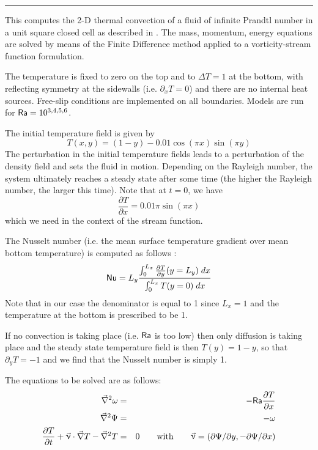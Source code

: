 \par\noindent\rule{\textwidth}{0.4pt}



This \stone computes the 2-D thermal convection of a fluid 
of infinite Prandtl number in a unit square closed cell as described in \textcite{blbc89}.
The mass, momentum, energy equations are solved by means of the Finite Difference method
applied to a vorticity-stream function formulation.

The temperature is fixed to zero on the top and to $\Delta T=1$ at the bottom, 
with reflecting symmetry at the sidewalls (i.e. $\partial_x T=0$) 
and there are no internal heat sources. 
Free-slip conditions are implemented on all boundaries. 
Models are run for ${\mathsf{Ra}}=10^{3,4,5,6}$.

The initial temperature field is given by 
\begin{equation}
T(x,y)=(1-y) - 0.01\cos(\pi x) \sin(\pi y)
\end{equation}
The perturbation in the initial temperature fields leads to 
a perturbation of the density field and sets the fluid in motion. 
Depending on the Rayleigh number, the system ultimately reaches a 
steady state after some time (the higher the Rayleigh number, the larger this time). 
Note that at $t=0$, we have
\[
\frac{\partial T}{\partial x} = 0.01 \pi \sin(\pi x)
\]
which we need in the context of the stream function.

The Nusselt number (i.e. the mean surface temperature gradient over 
mean bottom temperature)
is computed as follows \cite{blbc89}:
\begin{equation}
{\mathsf{Nu}} = L_y \frac{\int_0^{L_x} \frac{\partial T}{\partial y}(y=L_y) \; dx  }{\int_0^{L_x} T(y=0) \; dx}
\label{eqNu}
\end{equation}
Note that in our case the denominator is equal to 1 since $L_x=1$ 
and the temperature at the bottom is prescribed to be 1.

If no convection is taking place (i.e. ${\mathsf{Ra}}$ is too low) then 
only diffusion is taking place 
and the steady state temperature field is then $T(y)=1-y$, 
so that $\partial_y T=-1$ and we find that the Nusselt number is simply 1.

The equations to be solved are as follows:
\begin{eqnarray}
\vec\nabla^2 \omega &=& -{\mathsf{Ra}} \frac{\partial T}{\partial x} \\
\vec\nabla^2 \Psi   &=&  -\omega \\
\frac{\partial T}{\partial t} + \vec\upnu \cdot \vec\nabla T - \vec\nabla^2 T   &=& 0
\qquad \text{with} \qquad 
\vec\upnu=(\partial \Psi/\partial y,-\partial \Psi / \partial x)
\end{eqnarray}

